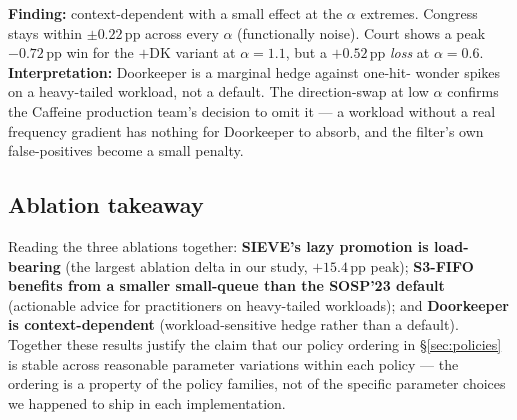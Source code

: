\textbf{Finding:} context-dependent with a small effect at the $\alpha$
extremes. Congress stays within $\pm 0.22$\,pp across every $\alpha$
(functionally noise). Court shows a peak $-0.72$\,pp win for the $+$DK
variant at $\alpha=1.1$, but a $+0.52$\,pp \emph{loss} at $\alpha=0.6$.
\textbf{Interpretation:} Doorkeeper is a marginal hedge against one-hit-
wonder spikes on a heavy-tailed workload, not a default. The
direction-swap at low $\alpha$ confirms the Caffeine production team's
decision to omit it --- a workload without a real frequency gradient has
nothing for Doorkeeper to absorb, and the filter's own false-positives
become a small penalty.

\subsection*{Ablation takeaway}

Reading the three ablations together: \textbf{SIEVE's lazy promotion is
load-bearing} (the largest ablation delta in our study, $+15.4$\,pp peak);
\textbf{S3-FIFO benefits from a smaller small-queue than the SOSP'23
default} (actionable advice for practitioners on heavy-tailed workloads);
and \textbf{Doorkeeper is context-dependent} (workload-sensitive hedge
rather than a default). Together these results justify the claim that our
policy ordering in \S\ref{sec:policies} is stable across reasonable
parameter variations within each policy --- the ordering is a property of
the policy families, not of the specific parameter choices we happened to
ship in each implementation.
